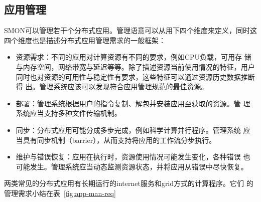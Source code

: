 
\subsection{应用管理}

SMON可以管理若干个分布式应用。管理语意可以从用下四个维度来定义，同时这
四个维度也是描述分布式应用管理需求的一般框架：

\begin{itemize}

\item 资源需求：不同的应用对计算资源有不同的要求，例如CPU负载，可用存
储与内存空间，网络带宽与延迟等等。除了描述资源当前使用情况的特征，用户
同时也对资源的可用性与稳定性有要求，这些特征可以通过资源历史数据推断得
出。管理系统应该可以发现符合应用管理规范的最佳资源。

\item 部署：管理系统根据用户的指令复制、解包并安装应用至获取的资源。管
理系统应当支持多种文件传输机制。

\item 同步：分布式应用可能分成多步完成，例如科学计算并行程序。管理系统
应当具有同步机制（barrier），从而支持将应用的工作流分步执行。

\item 维护与错误恢复：应用在执行时，资源使用情况可能发生变化，各种错误
也可能发生。管理系统应当动态监测资源状态，并将应用从错误中尽快恢复。

\end{itemize}

两类常见的分布式应用有长期运行的internet服务和grid方式的计算程序。它们
的管理需求小结在表~\ref{fig:app-man-req}

